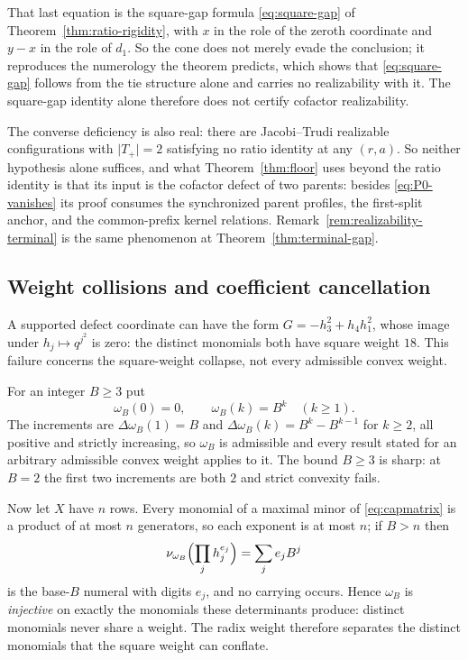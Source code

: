 \documentclass[11pt,a4paper]{amsart}
\numberwithin{equation}{section}
\theoremstyle{plain}
\theoremstyle{definition}
\begin{document}
That last equation is the square-gap formula \eqref{eq:square-gap} of Theorem~\ref{thm:ratio-rigidity}, with \(x\) in the role of the zeroth coordinate and \(y-x\) in the role of \(d_1\).  So the cone does not merely evade the conclusion; it reproduces the numerology the theorem predicts, which shows that \eqref{eq:square-gap} follows from the tie structure alone and carries no realizability with it.  The square-gap identity alone therefore does not certify cofactor realizability.

The converse deficiency is also real: there are Jacobi--Trudi realizable configurations with \(\lvert T_+\rvert=2\) satisfying no ratio identity at any \((r,a)\).  So neither hypothesis alone suffices, and what Theorem~\ref{thm:floor} uses beyond the ratio identity is that its input is the cofactor defect of two parents: besides \eqref{eq:P0-vanishes} its proof consumes the synchronized parent profiles, the first-split anchor, and the common-prefix kernel relations.  Remark~\ref{rem:realizability-terminal} is the same phenomenon at Theorem~\ref{thm:terminal-gap}.

\subsection{Weight collisions and coefficient cancellation}\label{subsec:weight-scope}

A supported defect coordinate can have the form \(G=-h_3^2+h_4h_1^2\),
whose image under \(h_j\mapsto q^{j^2}\) is zero: the distinct monomials
both have square weight \(18\).  This failure concerns the square-weight
collapse, not every admissible convex weight.

For an integer \(B\ge3\) put
\begin{equation}\label{eq:radix-weight}
\omega_B(0)=0,
\qquad
\omega_B(k)=B^k
\quad(k\ge1).
\end{equation}
The increments are \(\Delta\omega_B(1)=B\) and \(\Delta\omega_B(k)=B^k-B^{k-1}\) for \(k\ge2\), all positive and strictly increasing, so \(\omega_B\) is admissible and every result stated for an arbitrary admissible convex weight applies to it.  The bound \(B\ge3\) is sharp: at \(B=2\) the first two increments are both \(2\) and strict convexity fails.

Now let \(X\) have \(n\) rows.  Every monomial of a maximal minor of \eqref{eq:capmatrix} is a product of at most \(n\) generators, so each exponent is at most \(n\); if \(B>n\) then
\[
\nu_{\omega_B}\Bigl(\prod_j h_j^{e_j}\Bigr)
=
\sum_j e_jB^j
\]
is the base-\(B\) numeral with digits \(e_j\), and no carrying occurs.  Hence \(\omega_B\) is \emph{injective} on exactly the monomials these determinants produce: distinct monomials never share a weight.  The radix weight therefore separates the distinct monomials that the square weight can conflate.
\end{document}
